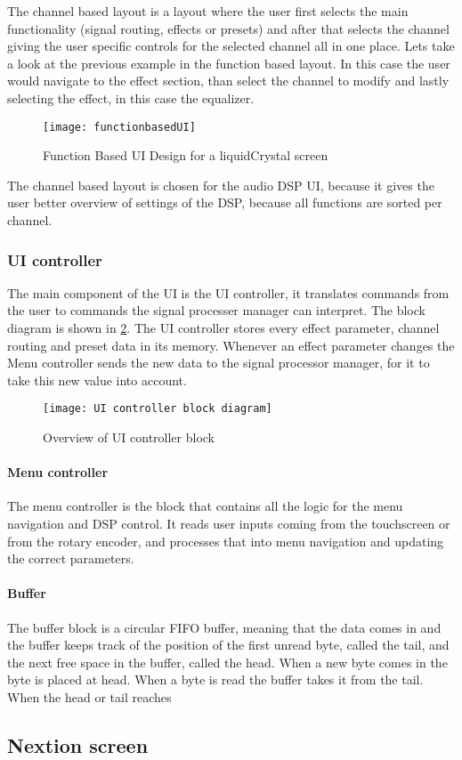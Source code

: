 The channel based layout is a layout where the user first selects the main functionality (signal routing, effects or presets) and after that selects the channel giving the user specific controls for the selected channel all in one place. Lets take a look at the previous example in the function based layout. In this case the user would navigate to the effect section, than select the channel to modify and lastly selecting the effect, in this case the equalizer.

\begin{figure}[ht]
    \texttt{[image: functionbasedUI]}
    \caption{Function Based UI Design for a liquidCrystal screen}
    \label{fig:functionbasedUI}
\end{figure}

The channel based layout is chosen for the audio DSP UI, because it gives the user better overview of settings of the DSP, because all functions are sorted per channel.

\subsubsection{UI controller}
The main component of the UI is the UI controller, it translates commands from the user to commands the signal processer manager can interpret. The block diagram is shown in \ref{fig:UIcontroller-block-diagram}. The UI controller stores every effect parameter, channel routing and preset data in its memory. Whenever an effect parameter changes the Menu controller sends the new data to the signal processor manager, for it to take this new value into account. 

\begin{figure}[ht]
    \texttt{[image: UI controller block diagram]}
    \caption{Overview of UI controller block}
    \label{fig:UIcontroller-block-diagram}
\end{figure}

\paragraph{Menu controller}
The menu controller is the block that contains all the logic for the menu navigation and DSP control. It reads user inputs coming from the touchscreen or from the rotary encoder, and processes that into menu navigation and updating the correct parameters.

\paragraph{Buffer}
The buffer block is a circular FIFO buffer, meaning that the data comes in and the buffer keeps track of the position of the first unread byte, called the tail, and the next free space in the buffer, called the head. When a new byte comes in the byte is placed at head. When a byte is read the buffer takes it from the tail. When the head or tail reaches

\subsection{Nextion screen}




